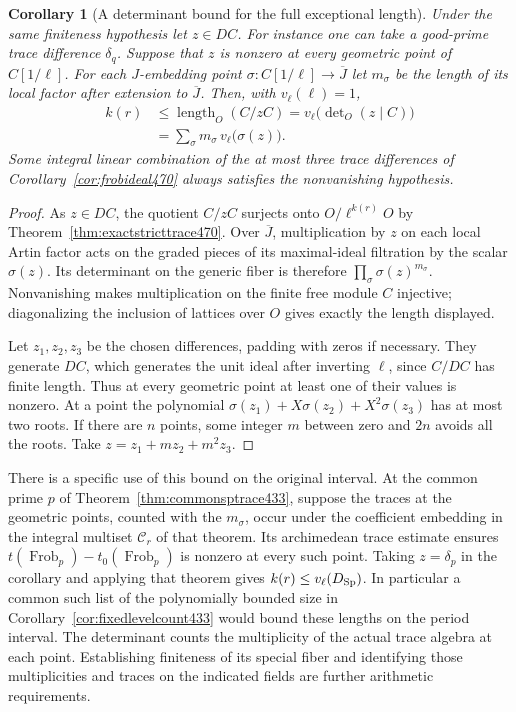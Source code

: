\documentclass[a4paper,11pt]{article}
\newtheorem{corollary}[proposition]{Corollary}
\theoremstyle{definition}
\theoremstyle{remark}
\numberwithin{equation}{section}
\begin{document}
\begin{corollary}[A determinant bound for the full exceptional length]\leavevmode
\label{cor:strictdet471}
Under the same finiteness hypothesis let \(z\in DC\). For instance
one can take a good-prime trace difference \(\delta_q\). Suppose
that \(z\) is nonzero at every geometric point of \(C[1/\ell]\).
For each \(J\)-embedding point \(\sigma:C[1/\ell]\to\overline J\)
let \(m_\sigma\) be the length of its local factor after extension
to \(\overline J\). Then, with \(v_\ell(\ell)=1\),
\[
 \begin{aligned}
 k(r)&\le \operatorname{length}_O(C/zC)
      =v_\ell\big(\det\nolimits_O(z\mid C)\big)\\
     &=\sum_{\sigma}m_\sigma\,v_\ell\big(\sigma(z)\big).
 \end{aligned}
\]
Some integral linear combination of the at most three trace
differences of Corollary~\ref{cor:frobideal470} always satisfies
the nonvanishing hypothesis.
\end{corollary}
\begin{proof}
As \(z\in DC\), the quotient \(C/zC\) surjects onto
\(O/\ell^{k(r)}O\) by Theorem~\ref{thm:exactstricttrace470}.
Over \(\overline J\), multiplication by \(z\) on each local
Artin factor acts on the graded pieces of its maximal-ideal
filtration by the scalar \(\sigma(z)\). Its determinant on the
generic fiber is therefore \(\prod_\sigma\sigma(z)^{m_\sigma}\).
Nonvanishing makes multiplication on the finite free module
\(C\) injective; diagonalizing the inclusion of lattices over
\(O\) gives exactly the length displayed.

Let \(z_1,z_2,z_3\) be the chosen differences, padding with zeros
if necessary. They generate \(DC\), which generates the unit ideal
after inverting \(\ell\), since \(C/DC\) has finite length.
Thus at every geometric point at least one of their values is
nonzero. At a point the polynomial
\(\sigma(z_1)+X\sigma(z_2)+X^2\sigma(z_3)\) has at most two
roots. If there are \(n\) points, some integer \(m\) between
zero and \(2n\) avoids all the roots. Take
\(z=z_1+mz_2+m^2z_3\).
\end{proof}

There is a specific use of this bound on the original interval.
At the common prime \(p\) of Theorem~\ref{thm:commonsptrace433},
suppose the traces at the geometric points, counted with the
\(m_\sigma\), occur under the coefficient embedding in the integral
multiset \(\mathcal C_r\) of that theorem. Its archimedean trace
estimate ensures \(t(\operatorname{Frob}_p)-t_0(\operatorname{Frob}_p)\)
is nonzero at every such point. Taking \(z=\delta_p\) in the
corollary and applying that theorem gives
\(k(r)\le v_\ell(D_{\rm Sp})\). In particular a common such list of
the polynomially bounded size in Corollary~\ref{cor:fixedlevelcount433}
would bound these lengths on the period interval. The determinant
counts the multiplicity of the actual trace algebra at each point.
Establishing finiteness of its special fiber and identifying those
multiplicities and traces on the indicated fields are further
arithmetic requirements.
\end{document}
